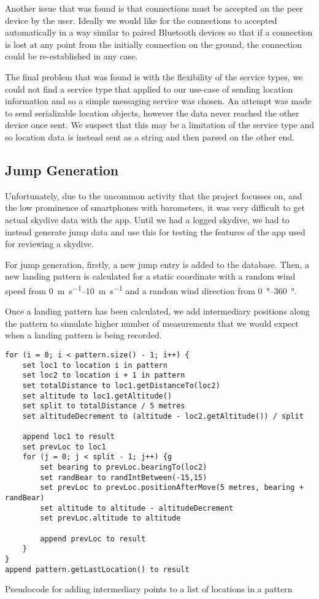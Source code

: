 Another issue that was found is that connections must be accepted on the peer device by the user. Ideally we would like for the connections to accepted automatically in a way similar to paired Bluetooth devices so that if a connection is lost at any point from the initially connection on the ground, the connection could be re-established in any case.

The final problem that was found is with the flexibility of the service types, we could not find a service type that applied to our use-case of sending location information and so a simple messaging service was chosen. An attempt was made to send serializable location objects, however the data never reached the other device once sent. We suspect that this may be a limitation of the service type and so location data is instead sent as a string and then parsed on the other end.

\subsection{Jump Generation}
Unfortunately, due to the uncommon activity that the project focusses on, and the low prominence of smartphones with barometers, it was very difficult to get actual skydive data with the app. Until we had a logged skydive, we had to instead generate jump data and use this for testing the features of the app used for reviewing a skydive.

For jump generation, firstly, a new jump entry is added to the database. Then, a new landing pattern is calculated for a static coordinate with a random wind speed from \SIrange{0}{10}{\metre\per\second} and a random wind direction from \SIrange{0}{360}{\degree}.

Once a landing pattern has been calculated, we add intermediary positions along the pattern to simulate higher number of measurements that we would expect when a landing pattern is being recorded.

\begin{listing*}
  \centering
  \begin{verbatim}
for (i = 0; i < pattern.size() - 1; i++) {
    set loc1 to location i in pattern
    set loc2 to location i + 1 in pattern
    set totalDistance to loc1.getDistanceTo(loc2)
    set altitude to loc1.getAltitude()
    set split to totalDistance / 5 metres
    set altitudeDecrement to (altitude - loc2.getAltitude()) / split

    append loc1 to result
    set prevLoc to loc1
    for (j = 0; j < split - 1; j++) {g
        set bearing to prevLoc.bearingTo(loc2)
        set randBear to randIntBetween(-15,15)
        set prevLoc to prevLoc.positionAfterMove(5 metres, bearing + randBear)
        set altitude to altitude - altitudeDecrement
        set prevLoc.altitude to altitude

        append prevLoc to result
    }
}
append pattern.getLastLocation() to result
  \end{verbatim}
  \caption{Pseudocode for adding intermediary points to a list of locations in a pattern}\label{lst:intermediary-points}
\end{listing*}

